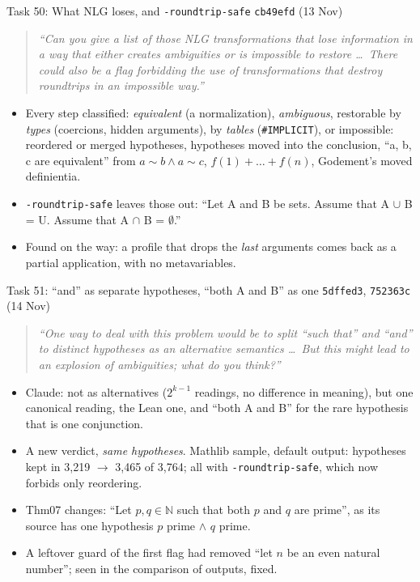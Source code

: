 \documentclass[10pt,aspectratio=169]{beamer}
\newcommand{\bad}[1]{\textcolor{warn}{#1}}
\newcommand{\ok}[1]{\textcolor{good}{#1}}
\newcommand{\commit}[1]{\texttt{\footnotesize #1}}
\newcommand{\prompt}[1]{\begin{quote}\small\itshape ``#1''\end{quote}}
\begin{document}
\begin{frame}{Task 50: What NLG loses, and \texttt{-roundtrip-safe}}
  \commit{cb49efd} (13 Nov)
  \prompt{Can you give a list of those NLG transformations that lose information in a way that
  either creates ambiguities or is impossible to restore \ldots\ There could also be a flag
  forbidding the use of transformations that destroy roundtrips in an impossible way.}
  \begin{itemize}\small
    \item Every step classified: \emph{equivalent} (a normalization), \emph{ambiguous},
          restorable by \emph{types} (coercions, hidden arguments), by \emph{tables}
          (\texttt{\#IMPLICIT}), or \bad{impossible}: reordered or merged hypotheses,
          hypotheses moved into the conclusion, ``a, b, c are equivalent'' from $a \sim b
          \wedge a \sim c$, $f(1) + \dots + f(n)$, Godement's moved definientia.
    \item \texttt{-roundtrip-safe} leaves those out: \ok{``Let A and B be sets. Assume that
          A $\cup$ B = U. Assume that A $\cap$ B = $\emptyset$.''}
    \item Found on the way: a profile that drops the \emph{last} arguments comes back as a
          partial application, with no metavariables.
  \end{itemize}
\end{frame}

\begin{frame}{Task 51: ``and'' as separate hypotheses, ``both A and B'' as one}
  \commit{5dffed3}, \commit{752363c} (14 Nov)
  \prompt{One way to deal with this problem would be to split ``such that'' and ``and'' to distinct
  hypotheses as an alternative semantics \ldots\ But this might lead to an explosion of
  ambiguities; what do you think?}
  \begin{itemize}\small
    \item Claude: not as alternatives ($2^{k-1}$ readings, no difference in meaning), but one
          canonical reading, the Lean one, and \ok{``both A and B''} for the rare hypothesis
          that is one conjunction.
    \item A new verdict, \emph{same hypotheses}. Mathlib sample, default output: hypotheses
          kept in \bad{3,219} $\to$ \ok{3,465} of 3,764; \ok{all} with
          \texttt{-roundtrip-safe}, which now forbids only reordering.
    \item Thm07 changes: \ok{``Let $p, q \in \mathbb{N}$ such that both $p$ and $q$ are
          prime''}, as its source has one hypothesis $p$ prime $\wedge$ $q$ prime.
    \item A leftover guard of the first flag had removed \bad{``let $n$ be an even natural
          number''}; seen in the comparison of outputs, fixed.
  \end{itemize}
\end{frame}
\end{document}
